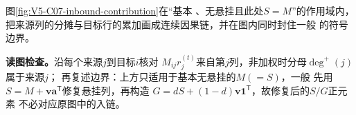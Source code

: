 \documentclass[UTF8,a4paper,11pt,openany]{ctexbook}
\begin{document}
\setcounter{page}{715}
\setcounter{chapter}{36}
\setcounter{section}{1}
\setcounter{figure}{3}
\pagestyle{headings}
图\ref{fig:V5-C07-inbound-contribution}在“基本 \PageRank{}、无悬挂且此处$S=M$”的作用域内，把来源列的分摊与目标行的累加画成连续因果链，并在图内同时封住一般 \PageRank{} 的符号边界。

\FloatBarrier
\noindent\textbf{读图检查。}沿每个来源$j$到目标$i$核对
$M_{ij}r_j^{(t)}$来自第$j$列，非加权时分母$\deg^+(j)$属于来源$j$；
再复述边界：上方只适用于基本无悬挂的$M(=S)$，一般 \PageRank{} 先用
$S=M+\boldsymbol v\boldsymbol a^{\mathsf T}$修复悬挂列，再构造
$G=dS+(1-d)\boldsymbol v\boldsymbol1^{\mathsf T}$，故修复后的$S/G$正元素
不必对应原图中的入链。
\end{document}
